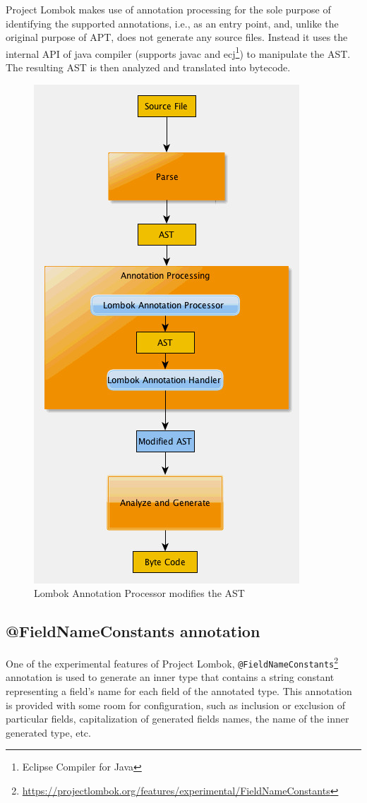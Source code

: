 Project Lombok makes use of annotation processing for the sole purpose of identifying the supported annotations, i.e., as an entry point, and, unlike the original purpose of APT, does not generate any source files. Instead it uses the internal API of java compiler (supports javac and ecj\footnote{Eclipse Compiler for Java}) to manipulate the AST. The resulting AST is then analyzed and translated into bytecode.
\begin{figure}[ht]\centering
    \includegraphics[scale=0.5]{images/lombok.jpg}
    \caption{Lombok Annotation Processor modifies the AST}
    \label{fig:lombok}
\end{figure}

\subsection{@FieldNameConstants annotation}
One of the experimental features of Project Lombok, \texttt{@FieldNameConstants}\footnote{\url{https://projectlombok.org/features/experimental/FieldNameConstants}} annotation is used to generate an inner type that contains a string constant representing a field’s name for each field of the annotated type. This annotation is provided with some room for configuration, such as inclusion or exclusion of particular fields, capitalization of generated fields names, the name of the inner generated type, etc.

